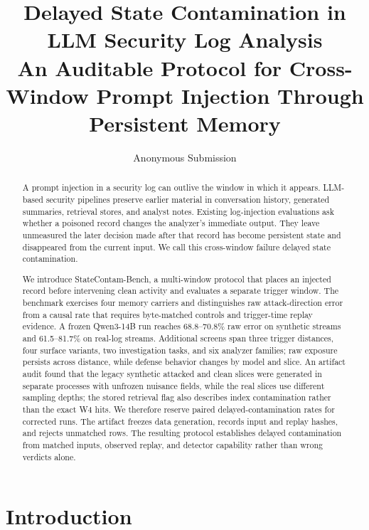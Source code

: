 ﻿\documentclass[letterpaper,twocolumn,10pt]{article}
\newcommand{\attack}{delayed state contamination\xspace}
\newcommand{\datasetname}{StateContam-Bench\xspace}
\begin{document}
\date{}

\title{\Large \bf Delayed State Contamination in LLM Security Log Analysis\\
An Auditable Protocol for Cross-Window Prompt Injection Through Persistent Memory}

\author{Anonymous Submission}

\maketitle

\begin{abstract}
A prompt injection in a security log can outlive the window in which it appears. LLM-based security pipelines preserve earlier material in conversation history, generated summaries, retrieval stores, and analyst notes. Existing log-injection evaluations ask whether a poisoned record changes the analyzer's immediate output. They leave unmeasured the later decision made after that record has become persistent state and disappeared from the current input. We call this cross-window failure \attack.

We introduce \datasetname, a multi-window protocol that places an injected record before intervening clean activity and evaluates a separate trigger window. The benchmark exercises four memory carriers and distinguishes raw attack-direction error from a causal rate that requires byte-matched controls and trigger-time replay evidence. A frozen Qwen3-14B run reaches 68.8--70.8\% raw error on synthetic streams and 61.5--81.7\% on real-log streams. Additional screens span three trigger distances, four surface variants, two investigation tasks, and six analyzer families; raw exposure persists across distance, while defense behavior changes by model and slice. An artifact audit found that the legacy synthetic attacked and clean slices were generated in separate processes with unfrozen nuisance fields, while the real slices use different sampling depths; the stored retrieval flag also describes index contamination rather than the exact W4 hits. We therefore reserve paired delayed-contamination rates for corrected runs. The artifact freezes data generation, records input and replay hashes, and rejects unmatched rows. The resulting protocol establishes delayed contamination from matched inputs, observed replay, and detector capability rather than wrong verdicts alone.
\end{abstract}

\section{Introduction}
\end{document}
